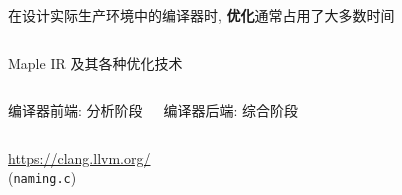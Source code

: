 \begin{frame}{}
  \begin{center}
    在设计实际生产环境中的编译器时, {\bf 优化}通常占用了大多数时间
  \end{center}

  \begin{columns}
  \end{columns}

  \vspace{0.50cm}
  \begin{center}
    Maple IR 及其各种优化技术
  \end{center}
\end{frame}

\begin{frame}{}
  \begin{columns}
      \begin{center}
        编译器前端: 分析阶段
      \end{center}
      \begin{center}
        编译器后端: 综合阶段
      \end{center}
  \end{columns}
\end{frame}

\begin{frame}{}
  \begin{center}

    \vspace{0.30cm}
    \url{https://clang.llvm.org/}\\[5pt]
    (\texttt{naming.c})
  \end{center}
\end{frame}



